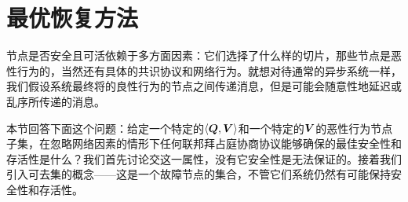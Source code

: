 \section{最优恢复方法}\label{sec:resilience}

节点是否安全且可活依赖于多方面因素：它们选择了什么样的{\quorum}切片，那些节点是恶性行为的，当然还有具体的共识协议和网络行为。就想对待通常的异步系统一样，我们假设系统最终将的良性行为的节点之间传递消息，但是可能会随意性地延迟或乱序所传递的消息。

本节回答下面这个问题：给定一个特定的$\langle{\bm Q},{\bm V}\rangle$和一个特定的${\bm V}$的恶性行为节点子集，在忽略网络因素的情形下任何联邦拜占庭协商协议能够确保的最佳安全性和存活性是什么？我们首先讨论{\quorum}交这一属性，没有它安全性是无法保证的。接着我们引入可去集的概念——这是一个故障节点的集合，不管它们系统仍然有可能保持安全性和存活性。



